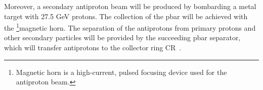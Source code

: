 Moreover, a secondary antiproton beam will be produced by bombarding a metal target with 27.5 GeV protons. The collection of the pbar will be achieved with the \footnote{Magnetic horn is a high-current, pulsed focusing device used for the antiproton beam.}{magnetic horn}. The separation of the antiprotons from primary protons
and other secondary particles will be provided by the succeeding pbar separator, which will transfer antiprotons to the collector ring CR~\cite{SI100_CR}.


